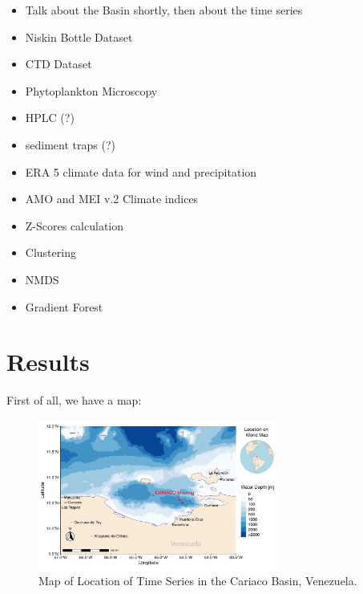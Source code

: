 \documentclass[a4paper]{article}
\begin{document}
        \begin{itemize}

            
            \item Talk about the Basin shortly, then about the time series
            
            \item Niskin Bottle Dataset

            \item CTD Dataset

            \item Phytoplankton Microscopy

            \item HPLC (?)

            \item sediment traps (?)

            \item ERA 5 climate data for wind and precipitation
            
            \item AMO and MEI v.2 Climate indices

            \item Z-Scores calculation
            
            \item Clustering
    
            \item NMDS
            
            \item Gradient Forest
            
        \end{itemize}

    \section{Results}
    \label{sec:results}
    
    
            First of all, we have a map:
            
        \begin{figure}[ht]
            \centering
            \includegraphics[width=0.7\textwidth]{fig/Artboard 1.pdf}
            \caption{Map of Location of Time Series in the Cariaco Basin, Venezuela.}
            \label{fig:example}
        \end{figure}
    
\end{document}
